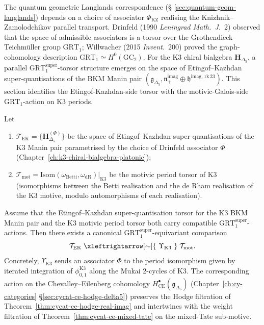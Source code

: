 The quantum geometric Langlands correspondence (\S
\textup{\ref{sec:quantum-geom-langlands}}) depends on a choice of
associator $\Phi_{\mathrm{KZ}}$ realising the Knizhnik--Zamolodchikov
parallel transport. Drinfeld (1990
\emph{Leningrad Math.\ J.}~2) observed that the space of admissible
associators is a torsor over the Grothendieck--Teichm\"uller group
$\mathrm{GRT}_1$; Willwacher (2015 \emph{Invent.}~200) proved the
graph-cohomology description $\mathrm{GRT}_1 \simeq H^0(\mathrm{GC}_2)$.
For the K3 chiral bialgebra $\mathbf{H}_{\Delta_5}$, a parallel
$\mathrm{GRT}_1^{\mathrm{super}}$-torsor structure emerges on the
space of Etingof--Kazhdan super-quantisations of the BKM Manin pair
$(\mathfrak{g}_{\Delta_5}, \mathfrak{n}_+^{\mathrm{imag}} \oplus
\mathfrak{h}^{\mathrm{imag},\,\mathrm{rk}\,23})$. This section
identifies the Etingof-Kazhdan-side torsor with the motivic-Galois-side
$\mathrm{GRT}_1$-action on K3 periods.

\begin{conjecture}
\label{thm:gl-unified-grt1-torsor-k3}
\ClaimStatusConjectured
Let
\begin{enumerate}[label=(\alph*)]
 \item $\mathcal{T}_{\mathrm{EK}} =
 \{\mathbf{H}_{\Delta_5}^{(\Phi)}\}$ be the space of
 Etingof--Kazhdan super-quantisations of the K3 Manin pair
 parametrised by the choice of Drinfeld associator $\Phi$
 (Chapter~\textup{\ref{ch:k3-chiral-bialgebra-platonic}});
 \item $\mathcal{T}_{\mathrm{mot}} = \mathrm{Isom}(\omega_{\mathrm{Betti}},
 \omega_{\mathrm{dR}})|_{\mathrm{K3}}$ be the motivic period torsor
 of K3 (isomorphisms between the Betti realisation and the de Rham
 realisation of the K3 motive, modulo
 automorphisms of each realisation).
\end{enumerate}
Assume that the Etingof--Kazhdan super-quantisation torsor for the K3
BKM Manin pair and the K3 motivic period torsor both carry compatible
$\mathrm{GRT}_1^{\mathrm{super}}$-actions. Then there exists a canonical
$\mathrm{GRT}_1^{\mathrm{super}}$-equivariant comparison
\[
 \mathcal{T}_{\mathrm{EK}}
 \;\xleftrightarrow[\sim]{\ \Upsilon_{\mathrm{K3}}\ }\;
 \mathcal{T}_{\mathrm{mot}}.
\]
Concretely, $\Upsilon_{\mathrm{K3}}$ sends an associator $\Phi$ to the
period isomorphism given by iterated integration of
$\phi_{0,1}^{\mathrm{K3}}$ along the Mukai 2-cycles of $\mathrm{K3}$.
The corresponding action on the Chevalley--Eilenberg cohomology
$H^\bullet_{\mathrm{CE}}(\mathfrak{g}_{\Delta_5})$
(Chapter~\textup{\ref{ch:cy-categories}}
\S\textup{\ref{sec:cycat-ce-hodge-delta5}}) preserves the Hodge
filtration of Theorem~\textup{\ref{thm:cycat-ce-hodge-real-imag}}
and intertwines with the weight filtration of
Theorem~\textup{\ref{thm:cycat-ce-mixed-tate}} on the mixed-Tate
sub-motive.
\end{conjecture}

